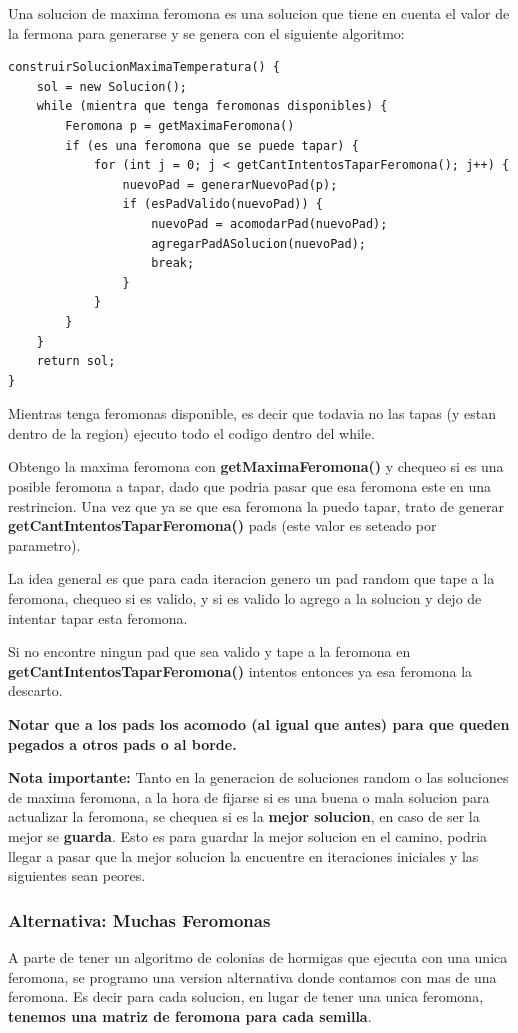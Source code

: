 Una solucion de maxima feromona es una solucion que tiene en cuenta el valor de la fermona para generarse y se genera con el siguiente algoritmo:


\begin{verbatim}
construirSolucionMaximaTemperatura() {
    sol = new Solucion();
    while (mientra que tenga feromonas disponibles) {
        Feromona p = getMaximaFeromona()
        if (es una feromona que se puede tapar) {
            for (int j = 0; j < getCantIntentosTaparFeromona(); j++) {
                nuevoPad = generarNuevoPad(p);
                if (esPadValido(nuevoPad)) {
                    nuevoPad = acomodarPad(nuevoPad);
                    agregarPadASolucion(nuevoPad);
                    break;
                }
            }
        }
    }
    return sol;
}
\end{verbatim}

Mientras tenga feromonas disponible, es decir que todavia no las tapas (y estan dentro de la region) ejecuto todo el codigo dentro del while. 

Obtengo la maxima feromona con \textbf{getMaximaFeromona()} y chequeo si es una posible feromona a tapar, dado que podria pasar que esa feromona este en una restrincion. 
Una vez que ya se que esa feromona la puedo tapar, trato de generar \textbf{getCantIntentosTaparFeromona()} pads (este valor es seteado por parametro). 

La idea general es que para cada iteracion genero un pad random que tape a la feromona, chequeo si es valido, y si es valido lo agrego a la solucion y dejo de intentar tapar esta feromona.

Si no encontre ningun pad que sea valido y tape a la feromona en \textbf{getCantIntentosTaparFeromona()} intentos entonces ya esa feromona la descarto. 

\textbf{Notar que a los pads los acomodo (al igual que antes) para que queden pegados a otros pads o al borde.}

\textbf{Nota importante:} Tanto en la generacion de soluciones random o las soluciones de maxima feromona, a la hora de fijarse si es una buena o mala solucion para actualizar la feromona, se chequea si es la \textbf{mejor solucion}, en caso de ser la mejor se \textbf{guarda}. Esto es para guardar la mejor solucion en el camino, podria llegar a pasar que la mejor solucion la encuentre en iteraciones iniciales y las siguientes sean peores.


\subsubsection{Alternativa: Muchas Feromonas}
A parte de tener un algoritmo de colonias de hormigas que ejecuta con una unica feromona, se programo una version alternativa donde contamos con mas de una feromona. Es decir para cada solucion, en lugar de tener una unica feromona, \textbf{tenemos una matriz de feromona para cada semilla}.
 
